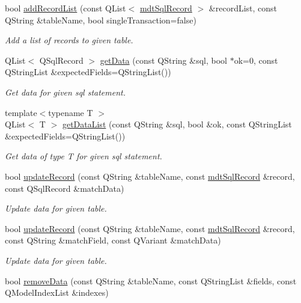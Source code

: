 \begin{DoxyCompactItemize}
bool \hyperlink{classmdt_tt_base_a26339dbcc81ba941b94f80a6769bd99d}{add\-Record\-List} (const Q\-List$<$ \hyperlink{classmdt_sql_record}{mdt\-Sql\-Record} $>$ \&record\-List, const Q\-String \&table\-Name, bool single\-Transaction=false)
\begin{DoxyCompactList}\small\item\em Add a list of records to given table. \end{DoxyCompactList}\item 
Q\-List$<$ Q\-Sql\-Record $>$ \hyperlink{classmdt_tt_base_aac6b0c135d2ff61d23ee9b37525a8ad5}{get\-Data} (const Q\-String \&sql, bool $\ast$ok=0, const Q\-String\-List \&expected\-Fields=Q\-String\-List())
\begin{DoxyCompactList}\small\item\em Get data for given sql statement. \end{DoxyCompactList}\item 
{\footnotesize template$<$typename T $>$ }\\Q\-List$<$ T $>$ \hyperlink{classmdt_tt_base_a6c0834b21432a734c6ebfb645f290716}{get\-Data\-List} (const Q\-String \&sql, bool \&ok, const Q\-String\-List \&expected\-Fields=Q\-String\-List())
\begin{DoxyCompactList}\small\item\em Get data of type T for given sql statement. \end{DoxyCompactList}\item 
bool \hyperlink{classmdt_tt_base_a40a9416a29d96518f39b2225516a2786}{update\-Record} (const Q\-String \&table\-Name, const \hyperlink{classmdt_sql_record}{mdt\-Sql\-Record} \&record, const Q\-Sql\-Record \&match\-Data)
\begin{DoxyCompactList}\small\item\em Update data for given table. \end{DoxyCompactList}\item 
bool \hyperlink{classmdt_tt_base_a884be1a05bf38121afda06758ff6ac41}{update\-Record} (const Q\-String \&table\-Name, const \hyperlink{classmdt_sql_record}{mdt\-Sql\-Record} \&record, const Q\-String \&match\-Field, const Q\-Variant \&match\-Data)
\begin{DoxyCompactList}\small\item\em Update data for given table. \end{DoxyCompactList}\item 
bool \hyperlink{classmdt_tt_base_a7b328098b5813497aedfb764a1ff787f}{remove\-Data} (const Q\-String \&table\-Name, const Q\-String\-List \&fields, const Q\-Model\-Index\-List \&indexes)

\end{DoxyCompactItemize}
